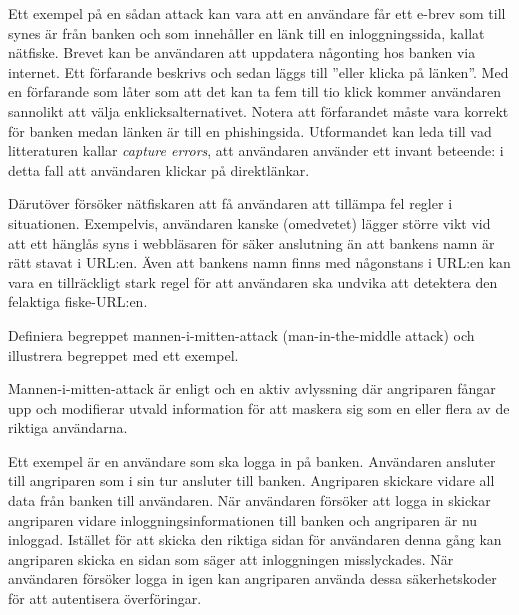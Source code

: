 \documentclass[a4paper,addpoints]{miunexam}
\begin{document}
\begin{questions}
\begin{parts}
\begin{solution}
      Ett exempel på en sådan attack kan vara att en användare får ett e-brev 
      som till synes är från banken och som innehåller en länk till en 
      inloggningssida, kallat nätfiske.
      Brevet kan be användaren att uppdatera någonting hos banken via internet.
      Ett förfarande beskrivs och sedan läggs till ''eller klicka på länken''.
      Med en förfarande som låter som att det kan ta fem till tio klick kommer 
      användaren sannolikt att välja enklicksalternativet.
      Notera att förfarandet måste vara korrekt för banken medan länken är till 
      en phishingsida.
      Utformandet kan leda till vad litteraturen \cite[s. 23]{Anderson2008sea} 
      kallar \emph{\foreignlanguage{english}{capture errors}}, att användaren 
      använder ett invant beteende: i detta fall att användaren klickar på 
      direktlänkar.

      Därutöver försöker nätfiskaren att få användaren att tillämpa fel regler 
      i situationen.
      Exempelvis, användaren kanske (omedvetet) lägger större vikt vid att ett 
      hänglås syns i webbläsaren för säker anslutning än att bankens namn är 
      rätt stavat i URL:en.
      Även att bankens namn finns med någonstans i URL:en kan vara en 
      tillräckligt stark regel för att användaren ska undvika att detektera den 
      felaktiga fiske-URL:en.
    \end{solution}
  \end{parts}

  \question[4]\label{q:mitm}
  Definiera begreppet mannen-i-mitten-attack 
  (\foreignlanguage{english}{man-in-the-middle attack}) och illustrera 
  begreppet med ett exempel.
  \begin{solution}
    Mannen-i-mitten-attack är enligt \citet[kap.\ 3]{Anderson2008sea} och 
    \citet{rfc4949} en aktiv avlyssning där angriparen fångar upp och 
    modifierar utvald information för att maskera sig som en eller flera av de 
    riktiga användarna.

    Ett exempel är en användare som ska logga in på banken.
    Användaren ansluter till angriparen som i sin tur ansluter till banken.
    Angriparen skickare vidare all data från banken till användaren.
    När användaren försöker att logga in skickar angriparen vidare 
    inloggningsinformationen till banken och angriparen är nu inloggad.
    Istället för att skicka den riktiga sidan för användaren denna gång kan 
    angriparen skicka en sidan som säger att inloggningen misslyckades.
    När användaren försöker logga in igen kan angriparen använda dessa 
    säkerhetskoder för att autentisera överföringar.
  \end{solution}


\end{questions}
\end{document}
